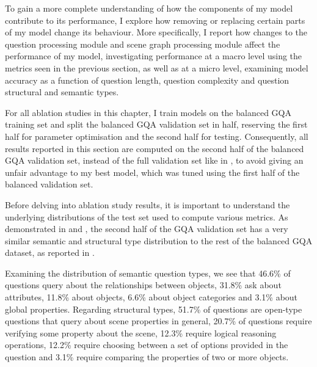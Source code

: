 To gain a more complete understanding of how the components of my model contribute to its performance, I explore how removing or replacing certain parts of my model change its behaviour. More specifically, I report how changes to the question processing module and scene graph processing module affect the performance of my model, investigating performance at a macro level using the metrics seen in the previous section, as well as at a micro level, examining model accuracy as a function of question length, question complexity and question structural and semantic types.  

For all ablation studies in this chapter, I train models on the balanced GQA training set and split the balanced GQA validation set in half, reserving the first half for parameter optimisation and the second half for testing. Consequently, all results reported in this section are computed on the second half of the balanced GQA validation set, instead of the full validation set like in \tableautorefname{ \ref{table:performance_comparison}}, to avoid giving an unfair advantage to my best model, which was tuned using the first half of the balanced validation set.

Before delving into ablation study results, it is important to understand the underlying distributions of the test set used to compute various metrics. As demonstrated in \tableautorefname{ \ref{tab:test_semantic_type_distribution}} and \tableautorefname{ \ref{tab:test_structural_type_distribution}}, the second half of the GQA validation set has a very similar semantic and structural type distribution to the rest of the balanced GQA dataset, as reported in \cite{hudson2019gqa_preprint}.

 Examining the distribution of semantic question types, we see that 46.6\% of questions query about the relationships between objects, 31.8\% ask about attributes, 11.8\% about objects, 6.6\% about object categories and 3.1\% about global properties. Regarding structural types, 51.7\% of questions are open-type questions that query about scene properties in general, 20.7\% of questions require verifying some property about the scene, 12.3\% require logical reasoning operations, 12.2\% require choosing between a set of options provided in the question and 3.1\% require comparing the properties of two or more objects.

